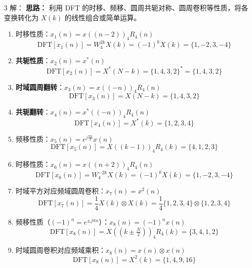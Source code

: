 \documentclass[10pt, a4paper, landscape]{article}
\begin{document}
\begin{multicols*}{3}
解：
\textbf{思路：} 利用 DFT 的时移、频移、圆周共轭对称、圆周卷积等性质，将各变换转化为 $X(k)$ 的线性组合或简单运算。

\begin{enumerate}
    \item[(1)] 时移性质：$x_1(n)=x((n-2))_4R_4(n)$
    \[
    \text{DFT}[x_1(n)] = W_4^{2k}X(k) = (-1)^k X(k) = \{1, -2, 3, -4\}
    \]

    \item[(2)] \textbf{\textcolor{myred}{共轭性质}}：$x_2(n)=x^*(n)$
    \[
    \text{DFT}[x_2(n)] = X^*(N-k) = \{1,4,3,2\}^* = \{1,4,3,2\}
    \]

    \item[(3)] \textbf{\textcolor{myred}{时域圆周翻转}}：$x_3(n)=x((-n))_4R_4(n)$
    \[
    \text{DFT}[x_3(n)] = X(N-k) = \{1,4,3,2\}
    \]

    \item[(4)] \textbf{\textcolor{myred}{共轭翻转}}：$x_4(n)=x^*((-n))_4R_4(n)$
    \[
    \text{DFT}[x_4(n)] = X^*(k) = \{1,2,3,4\}
    \]

    \item[(5)] 频移性质：$x_5(n)=e^{j\frac{\pi n}{2}}x(n)$
    \[
    \text{DFT}[x_5(n)] = X((k-1))_4R_4(k) = \{4,1,2,3\}
    \]

    \item[(6)] 时移性质：$x_6(n)=x((n+2))_4R_4(n)$
    \[
    \text{DFT}[x_6(n)] = W_4^{-2k}X(k) = (-1)^k X(k) = \{1,-2,3,-4\}
    \]

    \item[(7)] 时域平方对应频域圆周卷积：$x_7(n)=x^2(n)$
    \[
    \text{DFT}[x_7(n)] = \frac{1}{4}X(k)\otimes X(k)
    = \frac{1}{4}\{1,2,3,4\}\otimes\{1,2,3,4\}
    \]

    \item[(8)] 频移性质（$(-1)^n=e^{\pm j\pi n}$）：$x_8(n)=(-1)^n x(n)$
    \[
    \text{DFT}[x_8(n)] = X((k\pm\tfrac{N}{2}))_4R_4(k) = \{3,4,1,2\}
    \]

    \item[(9)] 时域圆周卷积对应频域乘积：$x_8(n)=x(n)\otimes x(n)$
    \[
    \text{DFT}[x_8(n)] = X^2(k) = \{1,4,9,16\}
    \]
\end{enumerate}


\end{multicols*}
\end{document}

